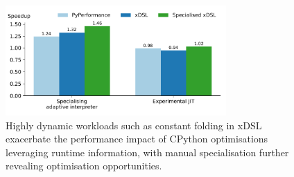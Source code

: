 \begin{figure}[H]
    \centering
    \includegraphics[width=0.75\textwidth]{images/impact_cpython_optimisations/15_summary.pdf}
    \caption{Highly dynamic workloads such as constant folding in xDSL exacerbate the performance impact of CPython optimisations leveraging runtime information, with manual specialisation further revealing optimisation opportunities.}
    \label{figure:impact-cpython-optimisations}
\end{figure}












